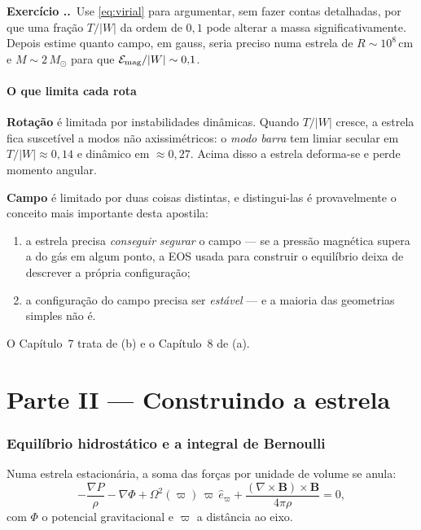 \documentclass[11pt,a4paper]{article}
\newcommand{\Msun}{M_\odot}
\newcounter{exerc}[section]
\newcommand{\ex}[1]{\refstepcounter{exerc}%
  \medskip\noindent\textbf{Exercício \thesection.\theexerc.}\ #1\medskip}
\begin{document}
\ex{Use \eqref{eq:virial} para argumentar, sem fazer contas detalhadas, por
que uma fração $T/|W|$ da ordem de $0{,}1$ pode alterar a massa
significativamente. Depois estime quanto campo, em gauss, seria preciso numa
estrela de $R \sim 10^8$\,cm e $M \sim 2\,\Msun$ para que
$\mathcal{E}_{\rm mag}/|W| \sim 0{,}1$.}

\subsection{O que limita cada rota}

\textbf{Rotação} é limitada por instabilidades dinâmicas. Quando $T/|W|$ cresce,
a estrela fica suscetível a modos não axissimétricos: o \emph{modo barra} tem
limiar secular em $T/|W| \approx 0{,}14$ e dinâmico em $\approx 0{,}27$. Acima
disso a estrela deforma-se e perde momento angular.

\textbf{Campo} é limitado por duas coisas distintas, e distingui-las é
provavelmente o conceito mais importante desta apostila:
\begin{enumerate}[label=(\alph*)]
\item a estrela precisa \emph{conseguir segurar} o campo --- se a pressão
      magnética supera a do gás em algum ponto, a EOS usada para construir o
      equilíbrio deixa de descrever a própria configuração;
\item a configuração do campo precisa ser \emph{estável} --- e a maioria das
      geometrias simples não é.
\end{enumerate}
O Capítulo~7 trata de (b) e o Capítulo~8 de (a).

\part*{Parte II --- Construindo a estrela}

\section{Equilíbrio hidrostático e a integral de Bernoulli}

Numa estrela estacionária, a soma das forças por unidade de volume se anula:
\begin{equation}
-\frac{\nabla P}{\rho} - \nabla\Phi
+ \Omega^2(\varpi)\,\varpi\,\hat{e}_\varpi
+ \frac{(\nabla\times\mathbf{B})\times\mathbf{B}}{4\pi\rho} = 0 ,
\label{eq:hidro}
\end{equation}
com $\Phi$ o potencial gravitacional e $\varpi$ a distância ao eixo.
\end{document}
